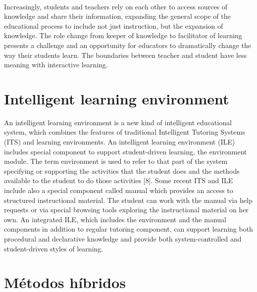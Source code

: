 \documentclass[12pt,letterpaper,oneside] {memoir}
\begin{document}
\paragraph{}
Increasingly, students and teachers rely on each other to access sources of knowledge and share their information, expanding the general scope of the educational process to include not just instruction, but the expansion of knowledge. The role change from keeper of knowledge to facilitator of learning presents a challenge and an opportunity for educators to dramatically change the way their students learn. The boundaries between teacher and student have less meaning with interactive learning.
\section{Intelligent learning environment}
An intelligent learning environment is a new kind of intelligent educational system, which combines the features of traditional Intelligent Tutoring Systems (ITS) and learning environments. An intelligent learning environment (ILE) includes special component to support student-driven learning, the environment module. The term environment is used to refer to that part of the system specifying or supporting the activities that the student does and the methods available to the student to do those activities [8]. Some recent ITS and ILE include also a special component called manual which provides an access to structured instructional material. The student can work with the manual via help requests or via special browsing tools exploring the instructional material on her own. An integrated ILE, which includes the environment and the manual components in addition to regular tutoring component, can support learning both procedural and declarative knowledge and provide both system-controlled and student-driven styles of learning.
\paragraph{}
\section{Métodos híbridos}
\end{document}
